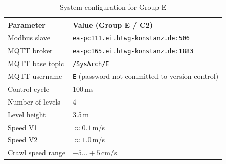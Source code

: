 \documentclass[12pt,a4paper]{article}
\begin{document}
\begin{table}[H]
\centering
\begin{tabularx}{\textwidth}{lX}
\toprule
\textbf{Parameter} & \textbf{Value (Group E / C2)} \\
\midrule
Modbus slave      & \texttt{ea-pc111.ei.htwg-konstanz.de:506} \\
MQTT broker       & \texttt{ea-pc165.ei.htwg-konstanz.de:1883} \\
MQTT base topic   & \texttt{/SysArch/E} \\
MQTT username     & \texttt{E} \quad (password not committed to version control) \\
Control cycle     & 100\,ms \\
Number of levels  & 4 \\
Level height      & 3.5\,m \\
Speed V1          & $\approx 0.1$\,m/s \\
Speed V2          & $\approx 1.0$\,m/s \\
Crawl speed range & $-5 \ldots +5$\,cm/s \\
\bottomrule
\end{tabularx}
\caption{System configuration for Group E}
\end{table}
\end{document}
